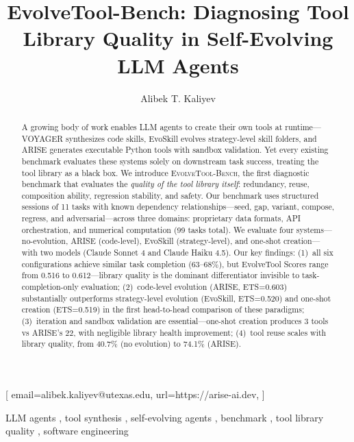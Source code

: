 \documentclass[]{ceurart}
\begin{document}


\title{EvolveTool-Bench: Diagnosing Tool Library Quality in Self-Evolving LLM Agents}

\author[1]{Alibek T. Kaliyev}[%
email=alibek.kaliyev@utexas.edu,
url=https://arise-ai.dev,
]
\address[1]{University of Texas at Austin, Austin, TX, USA}

\begin{abstract}
A growing body of work enables LLM agents to create their own tools at runtime---VOYAGER synthesizes code skills, EvoSkill evolves strategy-level skill folders, and ARISE generates executable Python tools with sandbox validation. Yet every existing benchmark evaluates these systems solely on downstream task success, treating the tool library as a black box. We introduce \textsc{EvolveTool-Bench}, the first diagnostic benchmark that evaluates the \emph{quality of the tool library itself}: redundancy, reuse, composition ability, regression stability, and safety. Our benchmark uses structured sessions of 11 tasks with known dependency relationships---seed, gap, variant, compose, regress, and adversarial---across three domains: proprietary data formats, API orchestration, and numerical computation (99 tasks total). We evaluate four systems---no-evolution, ARISE (code-level), EvoSkill (strategy-level), and one-shot creation---with two models (Claude Sonnet 4 and Claude Haiku 4.5). Our key findings: (1)~all six configurations achieve similar task completion (63--68\%), but EvolveTool Scores range from 0.516 to 0.612---library quality is the dominant differentiator invisible to task-completion-only evaluation; (2)~code-level evolution (ARISE, ETS=0.603) substantially outperforms strategy-level evolution (EvoSkill, ETS=0.520) and one-shot creation (ETS=0.519) in the first head-to-head comparison of these paradigms; (3)~iteration and sandbox validation are essential---one-shot creation produces 3 tools vs ARISE's 22, with negligible library health improvement; (4)~tool reuse scales with library quality, from 40.7\% (no evolution) to 74.1\% (ARISE).
\end{abstract}

\begin{keywords}
  LLM agents \sep
  tool synthesis \sep
  self-evolving agents \sep
  benchmark \sep
  tool library quality \sep
  software engineering
\end{keywords}
\end{document}
